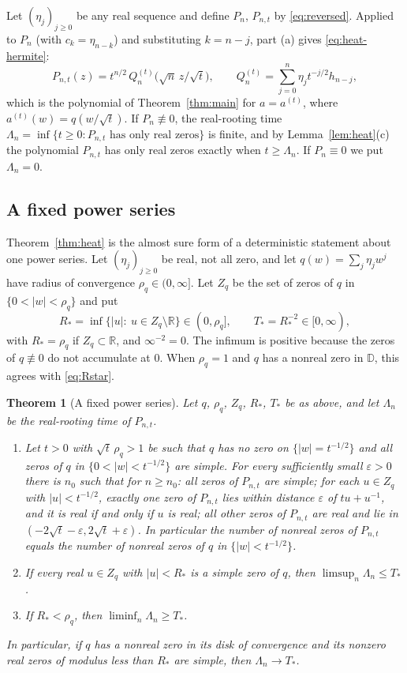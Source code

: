 \documentclass[11pt]{amsart}
\newtheorem{theorem}{Theorem}[section]
\theoremstyle{definition}
\theoremstyle{remark}
\numberwithin{equation}{section}
\newcommand{\R}{\mathbb{R}}
\newcommand{\D}{\mathbb{D}}
\newcommand{\eps}{\varepsilon}
\begin{document}
Let $(\eta_j)_{j\ge0}$ be any real sequence and define $P_n$, $P_{n,t}$ by \eqref{eq:reversed}. Applied to $P_n$ (with $c_k=\eta_{n-k}$) and substituting $k=n-j$, part (a) gives \eqref{eq:heat-hermite}:
\begin{equation}\label{eq:PQ}
P_{n,t}(z)=t^{n/2}\,Q_n^{(t)}\bigl(\sqrt n\,z/\sqrt t\bigr),\qquad Q_n^{(t)}=\sum_{j=0}^{n}\eta_jt^{-j/2}h_{n-j},
\end{equation}
which is the polynomial of Theorem~\ref{thm:main} for $a=a^{(t)}$, where $a^{(t)}(w)=q(w/\sqrt t)$. If $P_n\not\equiv0$, the real-rooting time $\Lambda_n=\inf\{t\ge0:P_{n,t}\text{ has only real zeros}\}$ is finite, and by Lemma~\ref{lem:heat}(c) the polynomial $P_{n,t}$ has only real zeros exactly when $t\ge\Lambda_n$. If $P_n\equiv0$ we put $\Lambda_n=0$.

\subsection{A fixed power series}

Theorem~\ref{thm:heat} is the almost sure form of a deterministic statement about one power series. Let $(\eta_j)_{j\ge0}$ be real, not all zero, and let $q(w)=\sum_j\eta_jw^j$ have radius of convergence $\rho_q\in(0,\infty]$. Let $Z_q$ be the set of zeros of $q$ in $\{0<|w|<\rho_q\}$ and put
\begin{equation}\label{eq:Rstar-det}
R_*=\inf\{|u|:\ u\in Z_q\setminus\R\}\in(0,\rho_q],\qquad T_*=R_*^{-2}\in[0,\infty),
\end{equation}
with $R_*=\rho_q$ if $Z_q\subset\R$, and $\infty^{-2}=0$. The infimum is positive because the zeros of $q\not\equiv0$ do not accumulate at $0$. When $\rho_q=1$ and $q$ has a nonreal zero in $\D$, this agrees with \eqref{eq:Rstar}.

\begin{theorem}[A fixed power series]\label{thm:fixedq}
Let $q$, $\rho_q$, $Z_q$, $R_*$, $T_*$ be as above, and let $\Lambda_n$ be the real-rooting time of $P_{n,t}$.
\begin{enumerate}
\item[(a)] Let $t>0$ with $\sqrt t\,\rho_q>1$ be such that $q$ has no zero on $\{|w|=t^{-1/2}\}$ and all zeros of $q$ in $\{0<|w|<t^{-1/2}\}$ are simple. For every sufficiently small $\eps>0$ there is $n_0$ such that for $n\ge n_0$: all zeros of $P_{n,t}$ are simple; for each $u\in Z_q$ with $|u|<t^{-1/2}$, exactly one zero of $P_{n,t}$ lies within distance $\eps$ of $tu+u^{-1}$, and it is real if and only if $u$ is real; all other zeros of $P_{n,t}$ are real and lie in $(-2\sqrt t-\eps,2\sqrt t+\eps)$. In particular the number of nonreal zeros of $P_{n,t}$ equals the number of nonreal zeros of $q$ in $\{|w|<t^{-1/2}\}$.
\item[(b)] If every real $u\in Z_q$ with $|u|<R_*$ is a simple zero of $q$, then $\limsup_{n}\Lambda_n\le T_*$.
\item[(c)] If $R_*<\rho_q$, then $\liminf_n\Lambda_n\ge T_*$.
\end{enumerate}
In particular, if $q$ has a nonreal zero in its disk of convergence and its nonzero real zeros of modulus less than $R_*$ are simple, then $\Lambda_n\to T_*$.
\end{theorem}
\end{document}
